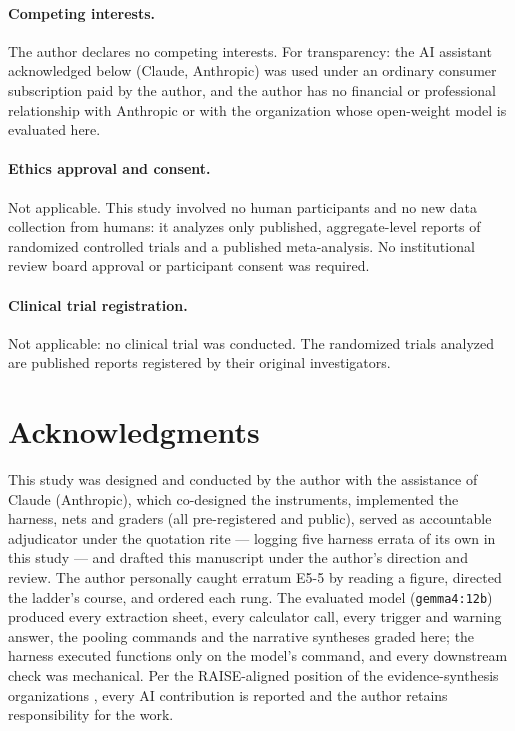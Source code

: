 \documentclass[11pt]{article}
\begin{document}
\paragraph{Competing interests.} The author declares no competing interests. For transparency: the AI assistant acknowledged below (Claude, Anthropic) was used under an ordinary consumer subscription paid by the author, and the author has no financial or professional relationship with Anthropic or with the organization whose open-weight model is evaluated here.

\paragraph{Ethics approval and consent.} Not applicable. This study involved no human participants and no new data collection from humans: it analyzes only published, aggregate-level reports of randomized controlled trials and a published meta-analysis. No institutional review board approval or participant consent was required.

\paragraph{Clinical trial registration.} Not applicable: no clinical trial was conducted. The randomized trials analyzed are published reports registered by their original investigators.

\section*{Acknowledgments}

This study was designed and conducted by the author with the assistance of Claude (Anthropic), which co-designed the instruments, implemented the harness, nets and graders (all pre-registered and public), served as accountable adjudicator under the quotation rite --- logging five harness errata of its own in this study --- and drafted this manuscript under the author's direction and review. The author personally caught erratum E5-5 by reading a figure, directed the ladder's course, and ordered each rung. The evaluated model (\texttt{gemma4:12b}) produced every extraction sheet, every calculator call, every trigger and warning answer, the pooling commands and the narrative syntheses graded here; the harness executed functions only on the model's command, and every downstream check was mechanical. Per the RAISE-aligned position of the evidence-synthesis organizations \citep{flemyng2025position}, every AI contribution is reported and the author retains responsibility for the work.


\end{document}
